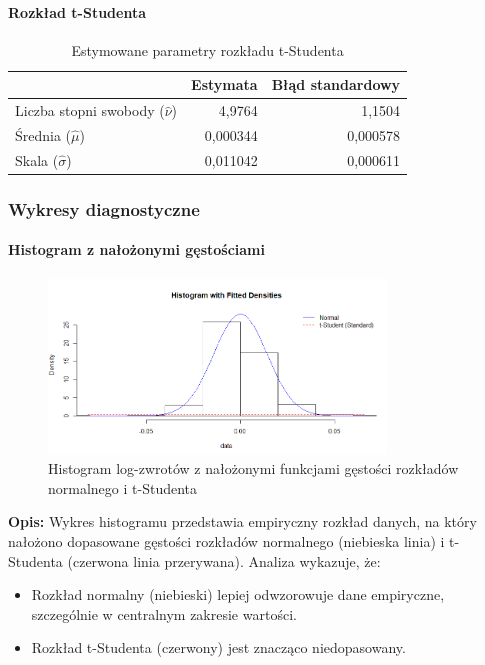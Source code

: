 \documentclass[a4paper,11pt]{article}
\begin{document}
\paragraph{Rozkład t-Studenta}

\begin{table}[H]
    \centering
    \begin{tabular}{|l|r|r|}
        \hline
        & \textbf{Estymata} & \textbf{Błąd standardowy} \\
        \hline
        Liczba stopni swobody ($\hat{\nu}$) & 4,9764 & 1,1504 \\
        Średnia ($\hat{\mu}$) & 0,000344 & 0,000578 \\
        Skala ($\hat{\sigma}$) & 0,011042 & 0,000611 \\
        \hline
    \end{tabular}
    \caption{Estymowane parametry rozkładu t-Studenta}
    \label{tab:fit_t}
\end{table}

\subsubsection{Wykresy diagnostyczne}

\paragraph{Histogram z nałożonymi gęstościami}

\begin{figure}[H]
    \centering
    \includegraphics[width=0.8\textwidth]{./Wojtek/histogram-z-gestosciami.png}
    \caption{Histogram log-zwrotów z nałożonymi funkcjami gęstości rozkładów normalnego i t-Studenta}
    \label{fig:histogram_gestosci}
\end{figure}

\textbf{Opis:} Wykres histogramu przedstawia empiryczny rozkład danych, na który nałożono dopasowane gęstości rozkładów normalnego (niebieska linia) i t-Studenta (czerwona linia przerywana).  
Analiza wykazuje, że:
\begin{itemize}
    \item Rozkład normalny (niebieski) lepiej odwzorowuje dane empiryczne, szczególnie w centralnym zakresie wartości.
    \item Rozkład t-Studenta (czerwony) jest znacząco niedopasowany.
\end{itemize}
\end{document}

